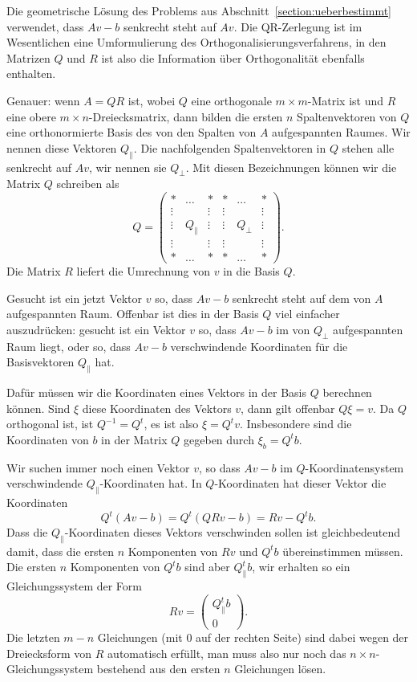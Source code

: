 Die geometrische Lösung des Problems aus Abschnitt~\ref{section:ueberbestimmt}
verwendet, dass $Av-b$ senkrecht steht auf $Av$.
Die QR-Zerlegung ist
im Wesentlichen eine Umformulierung des Orthogonalisierungsverfahrens, in den
Matrizen $Q$ und $R$ ist also die Information über Orthogonalität ebenfalls
enthalten.

Genauer: wenn $A=QR$ ist, wobei $Q$ eine orthogonale $m\times m$-Matrix
ist und $R$ eine obere $m\times n$-Dreiecksmatrix, dann bilden die
ersten $n$ Spaltenvektoren von $Q$ eine orthonormierte Basis des
von den Spalten von $A$ aufgespannten Raumes.
Wir nennen diese Vektoren
$Q_{\|}$.
Die nachfolgenden Spaltenvektoren
in $Q$ stehen alle senkrecht auf $Av$, wir nennen sie $Q_{\perp}$.
Mit diesen Bezeichnungen können wir die Matrix $Q$ schreiben als
\[
Q=\begin{pmatrix}
*     &\dots &     *&      *&\dots   &*     \\
\vdots&      &\vdots&\vdots &        &\vdots\\
\vdots&Q_{\|}&\vdots&\vdots&Q_{\perp}&\vdots\\
\vdots&      &\vdots&\vdots &        &\vdots\\
*     &\dots &     *&      *&\dots   &*     
\end{pmatrix}.
\]
Die Matrix $R$ liefert die Umrechnung von $v$ in die Basis $Q$.

Gesucht ist ein jetzt Vektor $v$ so, dass
$Av-b$ senkrecht steht auf dem von $A$ aufgespannten Raum.
Offenbar ist dies in der Basis $Q$ viel einfacher auszudrücken:
gesucht ist ein Vektor $v$ so, dass $Av-b$ im von $Q_{\perp}$
aufgespannten Raum liegt, oder so, dass $Av-b$ verschwindende Koordinaten
für die Basisvektoren $Q_{\|}$ hat.

Dafür müssen wir die Koordinaten eines Vektors in der Basis $Q$
berechnen können.
Sind $\xi$ diese Koordinaten des Vektors $v$,
dann gilt offenbar $Q\xi = v$.
Da $Q$ orthogonal ist, ist $Q^{-1}=Q^t$, es ist also $\xi=Q^tv$.
Insbesondere sind die Koordinaten von $b$ in der
Matrix $Q$ gegeben durch $\xi_b=Q^tb$.

Wir suchen immer noch einen Vektor $v$, so dass $Av-b$ im $Q$-Koordinatensystem
verschwindende $Q_{\|}$-Koordinaten hat.
In $Q$-Koordinaten hat dieser
Vektor die Koordinaten
\[
Q^t(Av-b)=Q^t(QRv-b)=Rv-Q^tb.
\]
Dass die $Q_{\|}$-Koordinaten dieses Vektors verschwinden sollen ist
gleichbedeutend damit, dass die ersten $n$ Komponenten von 
$Rv$ und $Q^tb$ übereinstimmen müssen.
Die ersten $n$ Komponenten
von $Q^tb$ sind aber $Q_{\|}^tb$, wir erhalten so ein Gleichungssystem
der Form
\begin{equation}
Rv=\begin{pmatrix}
Q_{\|}^tb\\
0
\end{pmatrix}.
\label{qr-leastsquares}
\end{equation}
Die letzten $m-n$ Gleichungen (mit $0$ auf der rechten Seite) sind dabei
wegen der Dreiecksform von $R$ automatisch erfüllt, man muss also nur
noch das $n\times n$-Gleichungssystem bestehend aus den ersten $n$
Gleichungen lösen.

